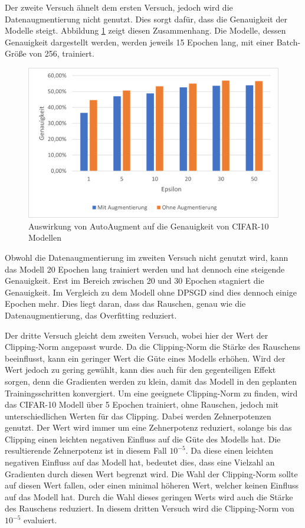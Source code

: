 Der zweite Versuch ähnelt dem ersten Versuch, jedoch wird die Datenaugmentierung nicht genutzt.
Dies sorgt dafür, dass die Genauigkeit der Modelle steigt. 
Abbildung \ref{fig:cifar_aug3} zeigt diesen Zusammenhang.
Die Modelle, dessen Genauigkeit dargestellt werden, werden jeweils 15 Epochen lang, mit einer Batch-Größe von 256, trainiert.
\begin{figure}[!htb]
    \centering
    \includegraphics[width=14cm]{figures/results_cifar/cifar_aug3.png}
    \caption{Auswirkung von AutoAugment auf die Genauigkeit von CIFAR-10 Modellen}
    \label{fig:cifar_aug3}
\end{figure} 
Obwohl die Datenaugmentierung im zweiten Versuch nicht genutzt wird, kann das Modell 20 Epochen lang trainiert werden und hat dennoch eine steigende Genauigkeit.
Erst im Bereich zwischen 20 und 30 Epochen stagniert die Genauigkeit.
Im Vergleich zu dem Modell ohne DPSGD sind dies dennoch einige Epochen mehr.
Dies liegt daran, dass das Rauschen, genau wie die Datenaugmentierung, das Overfitting reduziert.

Der dritte Versuch gleicht dem zweiten Versuch, wobei hier der Wert der Clipping-Norm angepasst wurde.
Da die Clipping-Norm die Stärke des Rauschens beeinflusst, kann ein geringer Wert die Güte eines Modells erhöhen.
Wird der Wert jedoch zu gering gewählt, kann dies auch für den gegenteiligen Effekt sorgen, denn die Gradienten werden zu klein, damit das Modell in den geplanten Trainingsschritten konvergiert.
Um eine geeignete Clipping-Norm zu finden, wird das CIFAR-10 Modell über 5 Epochen trainiert, ohne Rauschen, jedoch mit unterschiedlichen Werten für das Clipping.
Dabei werden Zehnerpotenzen genutzt.
Der Wert wird immer um eine Zehnerpotenz reduziert, solange bis das Clipping einen leichten negativen Einfluss auf die Güte des Modells hat.
Die resultierende Zehnerpotenz ist in diesem Fall $10^{-5}$.
Da diese einen leichten negativen Einfluss auf das Modell hat, bedeutet dies, dass eine Vielzahl an Gradienten durch diesen Wert begrenzt wird.
Die Wahl der Clipping-Norm sollte auf diesen Wert fallen, oder einen minimal höheren Wert, welcher keinen Einfluss auf das Modell hat.
Durch die Wahl dieses geringen Werts wird auch die Stärke des Rauschens reduziert.
In diesem dritten Versuch wird die Clipping-Norm von $10^{-5}$ evaluiert.

